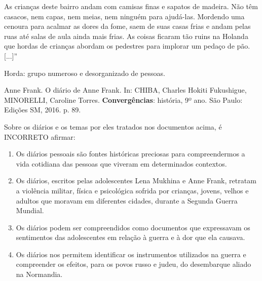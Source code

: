 \par

As crianças deste bairro andam com camisas finas e sapatos de madeira. Não têm casacos, nem capas, nem meias, nem ninguém para ajudá-las. Mordendo uma cenoura para acalmar as dores da fome, saem de suas casas frias e andam pelas ruas até salas de aula ainda mais frias. As coisas ficaram tão ruins na Holanda que hordas de crianças abordam os pedestres para implorar um pedaço de pão. [...]”

\par

Horda: grupo numeroso e desorganizado de pessoas.

\par

Anne Frank. O diário de Anne Frank. In: CHIBA, Charles Hokiti Fukushigue, MINORELLI, Caroline Torres. \textbf{Convergências}: história, 9º ano. São Paulo: Edições SM, 2016. p. 89.

\par

Sobre os diários e os temas por eles tratados nos documentos acima, é INCORRETO afirmar:\begin{enumerate}
\item Os diários pessoais são fontes históricas preciosas para compreendermos a vida cotidiana das pessoas
        que viveram em determinados contextos.
\item Os diários, escritos pelas adolescentes Lena Mukhina e Anne Frank, retratam a violência militar, física e
        psicológica sofrida por crianças, jovens, velhos e adultos que moravam em diferentes cidades, durante a
        Segunda Guerra Mundial.
\item Os diários podem ser compreendidos como documentos que expressavam os sentimentos das
        adolescentes em relação à guerra e à dor que ela causava.
\item Os diários nos permitem identificar os instrumentos utilizados na guerra e compreender os efeitos, para os
        povos russo e judeu, do desembarque aliado na Normandia.\end{enumerate}
